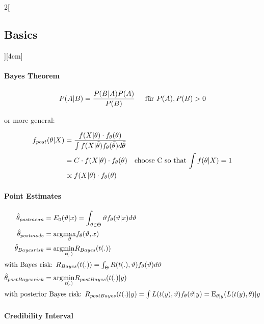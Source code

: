 \documentclass[8pt]{extarticle}
\begin{document}
\begin{multicols}{2}[\subsection{Basics}][4cm] 

\paragraph{Bayes Theorem}
$$P(A|B)=\frac{P(B|A)P(A)}{P(B)} \hspace{0.5cm} \text{für } P(A), P(B) > 0$$

or more general:

\vspace{-1 em}

\begin{align*}
  f_{post}(\theta | X) &= \frac{f(X | \theta ) \cdot f_\theta(\theta)}{\int f(X|\tilde{\theta}) f_\theta(\tilde{\theta})  d \tilde{\theta}}\\
  &= C \cdot f(X | \theta ) \cdot f_\theta(\theta) \hspace{1 em} \text{choose C so that $\int f(\theta | X)=1$} \\
  &\propto f(X | \theta ) \cdot f_\theta(\theta)
\end{align*}

\paragraph{Point Estimates}

\begin{align*}
\hat{\theta}_{postmean} &= E_0(\vartheta|x) = \int_{\vartheta \in \Theta} \vartheta f_\theta(\vartheta|x)d\vartheta\\
\hat{\theta}_{postmode} &= \mathrm{arg} \underset{\vartheta}{\max} f_\theta(\vartheta,x)\\
\hat{\theta}_{Bayesrisk} &= \mathrm{arg} \underset{t(.)}{\min} R_{Bayes}(t(.))\\
\intertext{with Bayes risk: $ R_{Bayes}(t(.)) = \int_{\Theta} R(t(.),\vartheta)f_\theta(\vartheta)d\vartheta$}
\hat{\theta}_{postBayesrisk} &= \mathrm{arg} \underset{t(.)}{\min} R_{postBayes}(t(.)|y)\\
\intertext{with posterior Bayes risk: $ R_{postBayes}(t(.)|y) = \int L(t(y),\vartheta) f_\theta(\vartheta|y) = \mathrm{E}_{\theta|y}(L(t(y),\theta)|y$}
\end{align*}

\vspace{-2em}
\paragraph{Credibility Interval}


\end{multicols}
\end{document}
